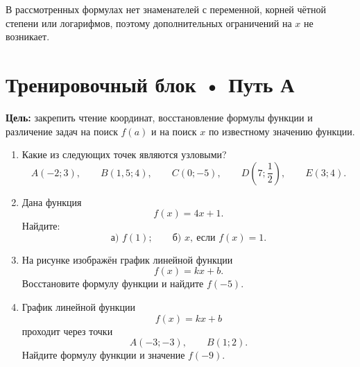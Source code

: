 \documentclass[a4paper,12pt]{article}
\begin{document}
В рассмотренных формулах нет знаменателей с переменной, корней чётной степени или логарифмов, поэтому дополнительных ограничений на \(x\) не возникает.


\clearpage
\section*{\color{darkaccent}Тренировочный блок • Путь А}

\textbf{Цель:} закрепить чтение координат, восстановление формулы функции и различение задач на поиск \(f(a)\) и на поиск \(x\) по известному значению функции.

\begin{enumerate}

\item
Какие из следующих точек являются узловыми?
\[
A(-2;3),\qquad
B(1{,}5;4),\qquad
C(0;-5),\qquad
D\left(7;\frac12\right),\qquad
E(3;4).
\]

\item
Дана функция
\[
f(x)=4x+1.
\]
Найдите:
\[
\text{а) }f(1);
\qquad
\text{б) }x,\ \text{если }f(x)=1.
\]

\item
На рисунке изображён график линейной функции
\[
f(x)=kx+b.
\]
Восстановите формулу функции и найдите \(f(-5)\).

\begin{center}
\end{center}

\item
График линейной функции
\[
f(x)=kx+b
\]
проходит через точки
\[
A(-3;-3),\qquad B(1;2).
\]
Найдите формулу функции и значение \(f(-9)\).


\end{enumerate}
\end{document}
